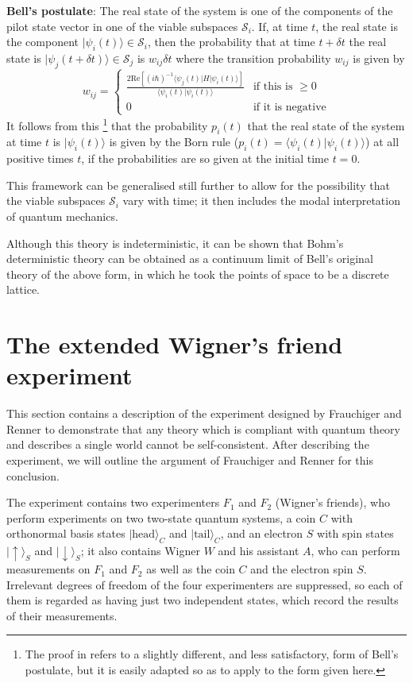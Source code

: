 \documentclass[12pt,a4paper,reqno]{article}
\newcommand{\head}{\text{head}}
\newcommand{\tail}{\text{tail}}
\newcommand{\semilinespace}{\vspace{0.5\baselineskip}}
\newcommand{\be}{\begin{equation}}
\newcommand{\ee}{\end{equation}}
\renewcommand{\(}{\left(}
\renewcommand{\)}{\right)}
\renewcommand{\.}{\centerdot}
\newcommand{\1}{\mathbf{1}}
\renewcommand{\S}{\mathcal{S}}
\newcommand{\<}{\langle}
\renewcommand{\>}{\rangle}
\theoremstyle{definition}
\theoremstyle{remark}
\numberwithin{equation}{section}
\begin{document}
\semilinespace

{\bf Bell's postulate}: The real state of the system is one of the components of the pilot state vector in one of the viable subspaces $\S_i$. If, at time $t$, the real state is the component $|\psi_i(t)\>\in\S_i$, then the probability that at time $t + \delta t$ the real state is $|\psi_j(t + \delta t)\>\in\S_j$ is $w_{ij}\delta t$ where the transition probability $w_{ij}$ is given by
\be\label{Bell}
w_{ij} = \begin{cases} \frac{2\text{Re}[(i\hbar)^{-1}\<\psi_j(t)|H|\psi_i(t)\>]}{\<\psi_i(t)|\psi_i(t)\>} &\text{if this is } \ge 0\\
                       0                                                  &\text{if it is negative}
         \end{cases}
\ee
It follows from this \cite{QMPN}\footnote{The proof in \cite{QMPN} refers to a slightly  different, and less satisfactory, form of Bell's postulate, but it is easily adapted so as to apply to the form given here.} that the probability $p_i(t) $ that the real state of the system at time $t$ is $|\psi_i(t)\>$ is given by the Born rule ($p_i(t) = \<\psi_i(t)|\psi_i(t)\>$) at all positive times $t$, if the probabilities are so given at the initial time $t = 0$.


This framework can be generalised still further \cite{BacciaDickson, verdammte} to allow for the possibility that the viable subspaces $\S_i$ vary with time; it then includes the modal interpretation of quantum mechanics.

Although this theory is indeterministic, it can be shown \cite{determlimit, Vink} that Bohm's deterministic theory can be obtained as a continuum limit of Bell's original theory of the above form, in which he took the points of space to be a discrete lattice.

\section{The extended Wigner's friend experiment}

This section contains a description of the experiment designed by Frauchiger and Renner \cite{FrauchigerRenner} to demonstrate that any theory which is compliant with quantum theory and describes a single world cannot be self-consistent. After describing the experiment, we will outline the argument of Frauchiger and Renner for this conclusion.

The experiment contains two experimenters $F_1$ and $F_2$ (Wigner's friends), who perform experiments on two two-state quantum systems, a coin $C$ with orthonormal basis states $|\head\>_C$ and $|\tail\>_C$, and an electron $S$ with spin states $|\uparrow\>_S$ and $|\downarrow\>_S$; it also contains Wigner $W$ and his assistant $A$, who can perform measurements on $F_1$ and $F_2$ as well as the coin $C$ and the electron spin $S$. Irrelevant degrees of freedom of the four experimenters are suppressed, so each of them is regarded as having just two independent states, which record the results of their measurements.
\end{document}
